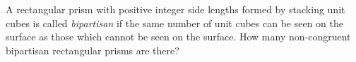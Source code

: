 A rectangular prism with positive integer side lengths formed by stacking unit cubes is called \emph{bipartisan} if the same number of unit cubes can be seen on the surface as those which cannot be seen on the surface. How many non-congruent bipartisan rectangular prisms are there?